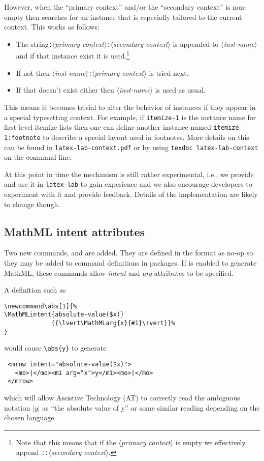 \documentclass{ltnews}
\providecommand\meta[1]{$\langle$\textrm{\itshape#1}$\rangle$}
\begin{document}
However, when the \enquote{primary context} and/or the
\enquote{secondary context} is non-empty then 
searches for an instance that is especially tailored to the current
context.  This works as follows:
\begin{itemize}
\item The string\texttt{:}\meta{primary
  context}\texttt{:}\meta{secondary context} is appended to
  \meta{inst-name} and if that instance exist it is
  used.\footnote{Note that this means that if the \meta{primary
    context} is empty we effectively append \texttt{::}\meta{secondary
    context}.}
\item
  If not then \meta{inst-name}\texttt{:}\meta{primary context} is
  tried next.
\item
  If that doesn't exist either then \meta{inst-name} is used as usual.
\end{itemize}
% 
This means it becomes trivial to alter the behavior of instances if
they appear in a special typesetting context. For example, if
\texttt{itemize-1} is the instance name for first-level itemize lists
then one can define another instance named \texttt{itemize-1:footnote}
to describe a special layout used in footnotes.  More details on this
can be found in \texttt{latex-lab-context.pdf} or by using
\verb*=texdoc latex-lab-context= on the command line.

At this point in time the mechanism is still rather experimental,
i.e., we provide and use it in \texttt{latex-lab} to gain experience
and we also encourage developers to experiment with it and provide
feedback. Details of the implementation are likely to change though.




\subsection{MathML intent attributes}

Two new commands,  and  are added. They
are defined in the format as no-op so they may be added to command
definitions in packages.  If  is enabled to generate
MathML, these commands allow \emph{intent} and \emph{arg} attributes
to be specified.

A  definition such as
\begin{verbatim}
\newcommand\abs[1]{%
\MathMLintent{absolute-value($x)}
             {{\lvert\MathMLarg{x}{#1}\rvert}}%
}
\end{verbatim}
would cause \verb|\abs{y}| to generate
\begin{verbatim}
 <mrow intent="absolute-value($x)">
   <mo>|</mo><mi arg="x">y</mi><mo>|</mo>
 </mrow>
\end{verbatim}
which will allow Assistive Technology (AT) to correctly read the
ambiguous notation $|y|$ as \enquote{the absolute value of y} or some
similar reading depending on the chosen language.
\end{document}
